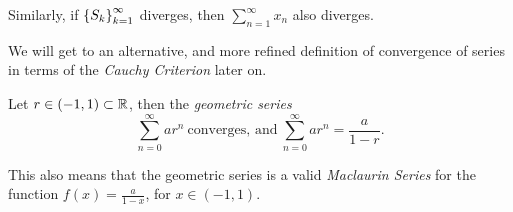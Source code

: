 \documentclass[12pt]{article}
\theoremstyle{definition}
\begin{document}
            \begin{note}
                Similarly, if $\left\{S_{k}\right\}_{k = 1}^{\infty}$ diverges, then $\sum_{n = 1}^{\infty}x_{n}$ also diverges.
            \end{note}
            \begin{remark}
                We will get to an alternative, and more refined definition of convergence of series in terms of the \emph{Cauchy Criterion} later on.
            \end{remark}
            \begin{prop}
                Let $r \in (-1, 1) \subset \R$, then the \emph{geometric series} 
                \begin{equation*}
                    \sum_{n = 0}^{\infty}ar^{n} ~ \text{converges, and} ~ \sum_{n = 0}^{\infty}ar^{n} = \frac{a}{1 - r}.
                \end{equation*} 
            \end{prop}
            \begin{note}
                This also means that the geometric series is a valid \emph{Maclaurin Series} for the function $f(x) = \frac{a}{1 - x}$, for $x \in (-1, 1)$.
            \end{note}
\end{document}
